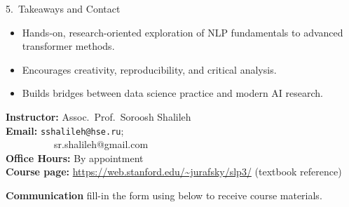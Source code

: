 \documentclass[aspectratio=169]{beamer}
\begin{document}
\begin{frame}{5.~Takeaways and Contact}
\begin{itemize}
  \item Hands-on, research-oriented exploration of NLP fundamentals to advanced transformer methods.
  \item Encourages creativity, reproducibility, and critical analysis.
  \item Builds bridges between data science practice and modern AI research.
\end{itemize}

\bigskip
\textbf{Instructor:} Assoc.\ Prof.\ Soroosh Shalileh\\
\textbf{Email:} \texttt{sshalileh@hse.ru}; \\ 
\textbf{\ \ \ \ \ \ \ \ } sr.shalileh@gmail.com \\
\textbf{Office Hours:} By appointment\\[0.5em]
\textbf{Course page:} \url{https://web.stanford.edu/~jurafsky/slp3/} (textbook reference)

\textbf{Communication} {\color{red}fill-in the form using} \href{https://docs.google.com/forms/d/e/1FAIpQLScSjsQMZNR5WmPqVBbzrdmQPuR3xlC9FB6X2P1VQGl_u9ROWw/viewform?usp=publish-editor}{\color{blue}{this link}}
below to receive course materials.


\end{frame}
\end{document}
